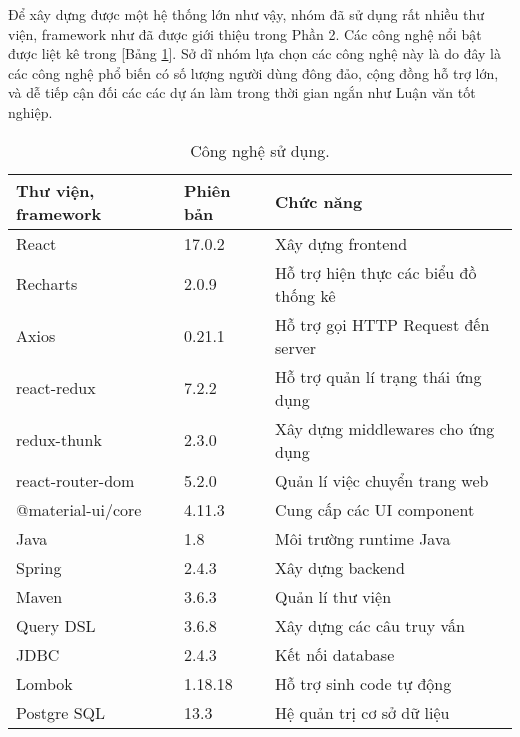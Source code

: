 Để xây dựng được một hệ thống lớn như vậy, nhóm đã sử dụng rất nhiều thư viện, framework như đã được giới thiệu trong Phần 2. Các công nghệ nổi bật được liệt kê trong [Bảng \ref{usedtech}]. Sở dĩ nhóm lựa chọn các công nghệ này là do đây là các công nghệ phổ biến có số lượng người dùng đông đảo, cộng đồng hỗ trợ lớn, và dễ tiếp cận đối các các dự án làm trong thời gian ngắn như Luận văn tốt nghiệp.

\begin{table}[H]
    \centering
    \begin{tabular}{|m{6cm}|m{3cm}|m{6cm}|}
    \hline 
        \textbf{Thư viện, framework} & \textbf{Phiên bản} & \textbf{Chức năng}\\ \hline
        React & 17.0.2 & Xây dựng frontend \\ \hline
        Recharts & 2.0.9 & Hỗ trợ hiện thực các biểu đồ thống kê \\ \hline
        Axios & 0.21.1 & Hỗ trợ gọi HTTP Request đến server \\ \hline
        react-redux & 7.2.2 & Hỗ trợ quản lí trạng thái ứng dụng \\ \hline
        redux-thunk & 2.3.0 & Xây dựng middlewares cho ứng dụng \\ \hline
        react-router-dom & 5.2.0 & Quản lí việc chuyển trang web \\ \hline
        @material-ui/core & 4.11.3 & Cung cấp các UI component \\ \hline
        Java & 1.8 & Môi trường runtime Java \\ \hline
        Spring & 2.4.3 & Xây dựng backend \\ \hline
        Maven & 3.6.3 & Quản lí thư viện \\ \hline
        Query DSL & 3.6.8 & Xây dựng các câu truy vấn \\ \hline
        JDBC & 2.4.3 & Kết nối database \\ \hline
        Lombok & 1.18.18 & Hỗ trợ sinh code tự động \\ \hline
        Postgre SQL & 13.3 & Hệ quản trị cơ sở dữ liệu \\ \hline
    \end{tabular}
    \caption{Công nghệ sử dụng.}
    \label{usedtech}
\end{table}